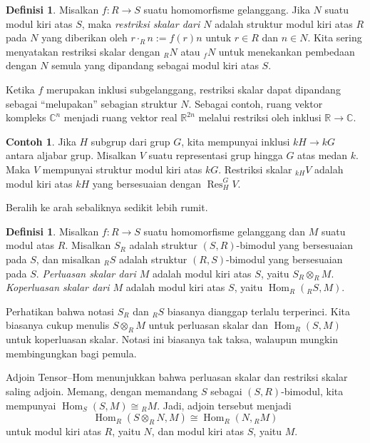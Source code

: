\documentclass[12pt]{article}
\theoremstyle{plain}
\theoremstyle{definition}
\newtheorem{definition}[theorem]{Definisi}
\newtheorem{example}[theorem]{Contoh}
\theoremstyle{remark}
\numberwithin{equation}{section}
\begin{document}
\begin{definition}
Misalkan $f : R \to S$ suatu homomorfisme gelanggang.
Jika $N$ suatu modul kiri atas $S$, maka \emph{restriksi skalar
dari $N$} adalah struktur modul kiri atas $R$ pada $N$ yang diberikan oleh
$r \cdot_R n := f(r)n$ untuk $r \in R$ dan $n \in N$.
Kita sering menyatakan restriksi skalar dengan ${}_RN$
atau ${}_fN$ untuk menekankan pembedaan dengan $N$ semula
yang dipandang sebagai modul kiri atas $S$.
\end{definition} 

Ketika $f$ merupakan inklusi subgelanggang, restriksi
skalar dapat dipandang sebagai “melupakan” sebagian struktur $N$.
Sebagai contoh, ruang vektor kompleks $\mathbb{C}^n$ menjadi ruang
vektor real $\mathbb{R}^{2n}$ melalui restriksi oleh inklusi
$\mathbb{R} \to \mathbb{C}$.

\begin{example}
Jika $H$ subgrup dari grup $G$, kita mempunyai inklusi
$kH \to kG$ antara aljabar grup.
Misalkan $V$ suatu representasi grup hingga $G$ atas medan $k$.
Maka $V$ mempunyai struktur modul kiri atas $kG$.
Restriksi skalar ${}_{kH}V$ adalah modul kiri atas $kH$
yang bersesuaian dengan $\operatorname{Res}_H^G V$. 
\end{example}

Beralih ke arah sebaliknya sedikit lebih rumit.

\begin{definition}
Misalkan $f : R \to S$ suatu homomorfisme gelanggang dan $M$ suatu modul atas $R$.
Misalkan $S_R$ adalah struktur $(S,R)$-bimodul yang bersesuaian pada $S$,
dan misalkan ${}_RS$ adalah struktur $(R,S)$-bimodul yang bersesuaian pada $S$.
\emph{Perluasan skalar dari $M$}
adalah modul kiri atas $S$, yaitu $S_R \otimes_R M$.
\emph{Koperluasan skalar dari $M$}
adalah modul kiri atas $S$, yaitu $\operatorname{Hom}_R({}_RS,M)$.
\end{definition}

Perhatikan bahwa notasi $S_R$ dan ${}_RS$ biasanya dianggap
terlalu terperinci.
Kita biasanya cukup menulis $S \otimes_R M$ untuk perluasan skalar
dan $\operatorname{Hom}_R(S,M)$ untuk koperluasan skalar.
Notasi ini biasanya tak taksa, walaupun mungkin membingungkan bagi pemula.

Adjoin Tensor--Hom menunjukkan bahwa perluasan skalar
dan restriksi skalar saling adjoin.
Memang, dengan memandang $S$ sebagai $(S,R)$-bimodul,
kita mempunyai $\operatorname{Hom}_S(S,M) \cong {}_RM$.
Jadi, adjoin tersebut menjadi
\[
\operatorname{Hom}_R(S \otimes_R N,M)
\cong \operatorname{Hom}_R(N,{}_RM)
\]
untuk modul kiri atas $R$, yaitu $N$, dan modul kiri atas $S$, yaitu $M$.
\end{document}
